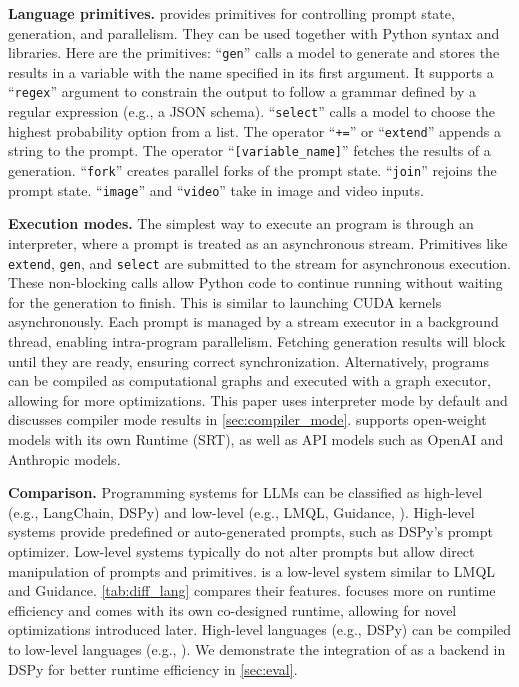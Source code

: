 \textbf{Language primitives.}
\lang provides primitives for controlling prompt state, generation, and parallelism. They can be used together with Python syntax and libraries.
Here are the primitives:
``\texttt{gen}'' calls a model to generate and stores the results in a variable with the name specified in its first argument. It supports a ``\texttt{regex}'' argument to constrain the output to follow a grammar defined by a regular expression (e.g., a JSON schema).
``\texttt{select}'' calls a model to choose the highest probability option from a list.
The operator ``\texttt{+=}'' or ``\texttt{extend}'' appends a string to the prompt.
The operator ``\texttt{[variable\_name]}'' fetches the results of a generation.
``\texttt{fork}'' creates parallel forks of the prompt state.
``\texttt{join}'' rejoins the prompt state.
``\texttt{image}'' and ``\texttt{video}'' take in image and video inputs.

\textbf{Execution modes.}
The simplest way to execute an \lang program is through an interpreter, where a prompt is treated as an asynchronous stream. Primitives like \texttt{extend}, \texttt{gen}, and \texttt{select} are submitted to the stream for asynchronous execution. These non-blocking calls allow Python code to continue running without waiting for the generation to finish. This is similar to launching CUDA kernels asynchronously. Each prompt is managed by a stream executor in a background thread, enabling intra-program parallelism. Fetching generation results will block until they are ready, ensuring correct synchronization.
Alternatively, \lang programs can be compiled as computational graphs and executed with a graph executor, allowing for more optimizations. This paper uses interpreter mode by default and discusses compiler mode results in \autoref{sec:compiler_mode}.
\lang supports open-weight models with its own \lang Runtime (SRT), as well as API models such as OpenAI and Anthropic models.

\textbf{Comparison.}
Programming systems for LLMs can be classified as high-level (e.g., LangChain, DSPy) and low-level (e.g., LMQL, Guidance, \lang).
High-level systems provide predefined or auto-generated prompts, such as DSPy's prompt optimizer.
Low-level systems typically do not alter prompts but allow direct manipulation of prompts and primitives.
\lang is a low-level system similar to LMQL and Guidance. \autoref{tab:diff_lang} compares their features.
\lang focuses more on runtime efficiency and comes with its own co-designed runtime, allowing for novel optimizations introduced later.
High-level languages (e.g., DSPy) can be compiled to low-level languages (e.g., \lang).
We demonstrate the integration of \lang as a backend in DSPy for better runtime efficiency in \autoref{sec:eval}.


